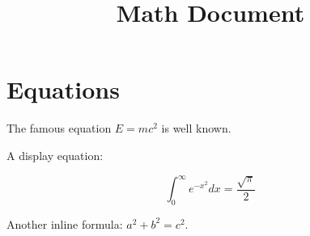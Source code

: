 \documentclass{article}
\title{Math Document}
\begin{document}
\maketitle

\section{Equations}

The famous equation $E = mc^2$ is well known.

A display equation:

\begin{equation}
\int_0^\infty e^{-x^2} dx = \frac{\sqrt{\pi}}{2}
\end{equation}

Another inline formula: \(a^2 + b^2 = c^2\).
\end{document}
